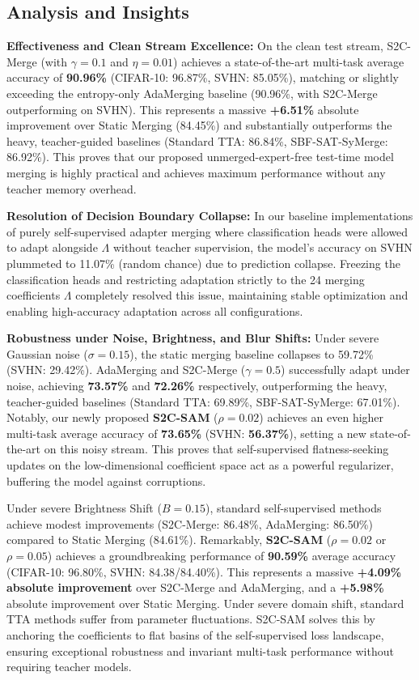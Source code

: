 \documentclass{article}
\theoremstyle{plain}
\theoremstyle{definition}
\theoremstyle{remark}
\begin{document}
\subsection{Analysis and Insights}

\textbf{Effectiveness and Clean Stream Excellence:} On the clean test stream, S2C-Merge (with $\gamma=0.1$ and $\eta=0.01$) achieves a state-of-the-art multi-task average accuracy of \textbf{90.96\%} (CIFAR-10: 96.87\%, SVHN: 85.05\%), matching or slightly exceeding the entropy-only AdaMerging baseline (90.96\%, with S2C-Merge outperforming on SVHN). This represents a massive \textbf{+6.51\%} absolute improvement over Static Merging (84.45\%) and substantially outperforms the heavy, teacher-guided baselines (Standard TTA: 86.84\%, SBF-SAT-SyMerge: 86.92\%). This proves that our proposed unmerged-expert-free test-time model merging is highly practical and achieves maximum performance without any teacher memory overhead.

\textbf{Resolution of Decision Boundary Collapse:} In our baseline implementations of purely self-supervised adapter merging where classification heads were allowed to adapt alongside $\Lambda$ without teacher supervision, the model's accuracy on SVHN plummeted to 11.07\% (random chance) due to prediction collapse. Freezing the classification heads and restricting adaptation strictly to the 24 merging coefficients $\Lambda$ completely resolved this issue, maintaining stable optimization and enabling high-accuracy adaptation across all configurations.

\textbf{Robustness under Noise, Brightness, and Blur Shifts:} Under severe Gaussian noise ($\sigma=0.15$), the static merging baseline collapses to 59.72\% (SVHN: 29.42\%). AdaMerging and S2C-Merge ($\gamma=0.5$) successfully adapt under noise, achieving \textbf{73.57\%} and \textbf{72.26\%} respectively, outperforming the heavy, teacher-guided baselines (Standard TTA: 69.89\%, SBF-SAT-SyMerge: 67.01\%). Notably, our newly proposed \textbf{S2C-SAM} ($\rho=0.02$) achieves an even higher multi-task average accuracy of \textbf{73.65\%} (SVHN: \textbf{56.37\%}), setting a new state-of-the-art on this noisy stream. This proves that self-supervised flatness-seeking updates on the low-dimensional coefficient space act as a powerful regularizer, buffering the model against corruptions.

Under severe Brightness Shift ($B=0.15$), standard self-supervised methods achieve modest improvements (S2C-Merge: 86.48\%, AdaMerging: 86.50\%) compared to Static Merging (84.61\%). Remarkably, \textbf{S2C-SAM} ($\rho=0.02$ or $\rho=0.05$) achieves a groundbreaking performance of \textbf{90.59\%} average accuracy (CIFAR-10: 96.80\%, SVHN: 84.38/84.40\%). This represents a massive \textbf{+4.09\% absolute improvement} over S2C-Merge and AdaMerging, and a \textbf{+5.98\%} absolute improvement over Static Merging. Under severe domain shift, standard TTA methods suffer from parameter fluctuations. S2C-SAM solves this by anchoring the coefficients to flat basins of the self-supervised loss landscape, ensuring exceptional robustness and invariant multi-task performance without requiring teacher models.
\end{document}
